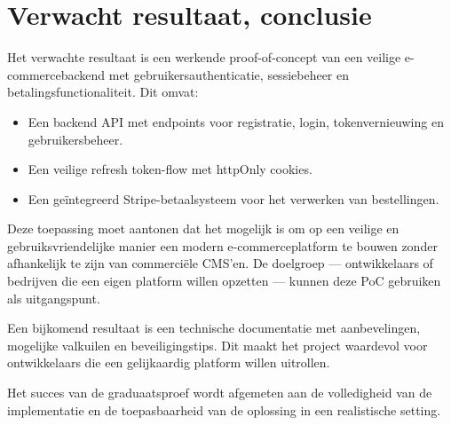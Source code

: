 \section{Verwacht resultaat, conclusie}%
\label{sec:verwachte_resultaten}
Het verwachte resultaat is een werkende proof-of-concept van een veilige e-commercebackend met gebruikersauthenticatie, sessiebeheer en betalingsfunctionaliteit. Dit omvat:

\begin{itemize}
  \item Een backend API met endpoints voor registratie, login, tokenvernieuwing en gebruikersbeheer.
  \item Een veilige refresh token-flow met httpOnly cookies.
  \item Een geïntegreerd Stripe-betaalsysteem voor het verwerken van bestellingen.
\end{itemize}

Deze toepassing moet aantonen dat het mogelijk is om op een veilige en gebruiksvriendelijke manier een modern e-commerceplatform te bouwen zonder afhankelijk te zijn van commerciële CMS'en. De doelgroep — ontwikkelaars of bedrijven die een eigen platform willen opzetten — kunnen deze PoC gebruiken als uitgangspunt.

Een bijkomend resultaat is een technische documentatie met aanbevelingen, mogelijke valkuilen en beveiligingstips. Dit maakt het project waardevol voor ontwikkelaars die een gelijkaardig platform willen uitrollen.

Het succes van de graduaatsproef wordt afgemeten aan de volledigheid van de implementatie en de toepasbaarheid van de oplossing in een realistische setting.






